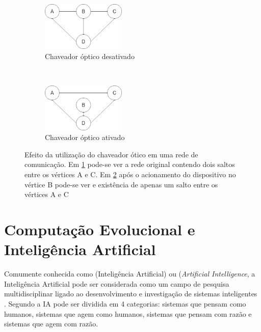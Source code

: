 \begin{figure}[t!]
	\centering
	\begin{subfigure}[t]{0.4\textwidth}
		\centering
		\includegraphics[width=4cm]{./figuras/Bypass-exemplo-A.png} %
		\caption{Chaveador óptico desativado}
		\label{fig_bypass_exemplo_A}
	\end{subfigure}%
	~
	\begin{subfigure}[t]{0.4\textwidth}
		\centering
		\includegraphics[width=4cm]{./figuras/Bypass-exemplo-B.png} %
	\caption{Chaveador óptico ativado}
	\label{fig_bypass_exemplo_B}
	\end{subfigure}
	\caption[Exemplo de atuação de \emph{by-pass} óptico]{Efeito da utilização do chaveador ótico em uma rede de comunicação. Em \ref{fig_bypass_exemplo_A} pode-se ver a rede original contendo dois saltos entre os vértices A e C. Em \ref{fig_bypass_exemplo_B} após o acionamento do dispositivo no vértice B pode-se ver e existência de apenas um salto entre os vértices A e C}
	\label{fig-bypass-exemplo}
\end{figure}

\section{Computação Evolucional e Inteligência Artificial}
Comumente conhecida como  (Inteligência Artificial) ou  (\emph{Artificial Intelligence}, a Inteligência Artificial pode ser considerada como um campo de pesquisa multidisciplinar ligado ao desenvolvimento e investigação de sistemas inteligentes \cite{Book-Brownlee2011}. Segundo \cite{Book-Russel2009} a IA pode ser dividida em 4 categorias: sistemas que pensam como humanos, sistemas que agem como humanos, sistemas que pensam com razão e sistemas que agem com razão.

